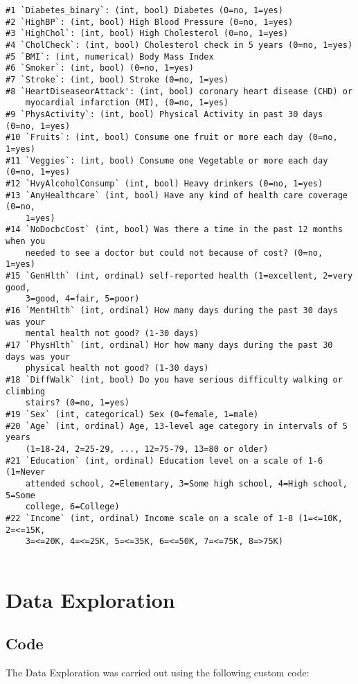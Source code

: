 \documentclass[11pt]{article}
\begin{document}
\begin{Verbatim}[tabsize=4]
#1 `Diabetes_binary`: (int, bool) Diabetes (0=no, 1=yes)
#2 `HighBP`: (int, bool) High Blood Pressure (0=no, 1=yes)
#3 `HighChol`: (int, bool) High Cholesterol (0=no, 1=yes)
#4 `CholCheck`: (int, bool) Cholesterol check in 5 years (0=no, 1=yes)
#5 `BMI`: (int, numerical) Body Mass Index
#6 `Smoker`: (int, bool) (0=no, 1=yes)
#7 `Stroke`: (int, bool) Stroke (0=no, 1=yes)
#8 `HeartDiseaseorAttack': (int, bool) coronary heart disease (CHD) or
	myocardial infarction (MI), (0=no, 1=yes)
#9 `PhysActivity`: (int, bool) Physical Activity in past 30 days (0=no, 1=yes)
#10 `Fruits`: (int, bool) Consume one fruit or more each day (0=no, 1=yes)
#11 `Veggies`: (int, bool) Consume one Vegetable or more each day (0=no, 1=yes)
#12 `HvyAlcoholConsump` (int, bool) Heavy drinkers (0=no, 1=yes)
#13 `AnyHealthcare` (int, bool) Have any kind of health care coverage (0=no,
	1=yes)
#14 `NoDocbcCost` (int, bool) Was there a time in the past 12 months when you
	needed to see a doctor but could not because of cost? (0=no, 1=yes)
#15 `GenHlth` (int, ordinal) self-reported health (1=excellent, 2=very good,
	3=good, 4=fair, 5=poor)
#16 `MentHlth` (int, ordinal) How many days during the past 30 days was your
	mental health not good? (1-30 days)
#17 `PhysHlth` (int, ordinal) Hor how many days during the past 30 days was your
	physical health not good? (1-30 days)
#18 `DiffWalk` (int, bool) Do you have serious difficulty walking or climbing
	stairs? (0=no, 1=yes)
#19 `Sex` (int, categorical) Sex (0=female, 1=male)
#20 `Age` (int, ordinal) Age, 13-level age category in intervals of 5 years
	(1=18-24, 2=25-29, ..., 12=75-79, 13=80 or older)
#21 `Education` (int, ordinal) Education level on a scale of 1-6 (1=Never
	attended school, 2=Elementary, 3=Some high school, 4=High school, 5=Some
	college, 6=College)
#22 `Income` (int, ordinal) Income scale on a scale of 1-8 (1=<=10K, 2=<=15K,
	3=<=20K, 4=<=25K, 5=<=35K, 6=<=50K, 7=<=75K, 8=>75K)


\end{Verbatim}

\section{Data Exploration} \subsection{Code}The Data Exploration was carried out using the following custom code:
\end{document}
